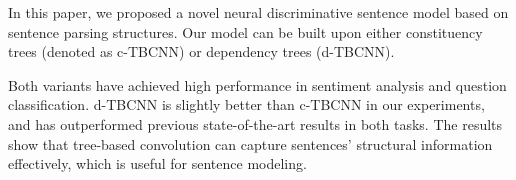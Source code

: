 \documentclass[11pt,a4paper]{article}
\begin{document}
\vspace{-.1cm}

In this paper, we proposed a novel neural
discriminative sentence model based on sentence parsing structures.
Our model can be built upon either constituency trees (denoted as c-TBCNN) or dependency trees (d-TBCNN).

Both variants have achieved high performance
in sentiment analysis and
question classification.
d-TBCNN is slightly better than c-TBCNN in our experiments, and 
has outperformed previous state-of-the-art results in both tasks. 
The results show that tree-based convolution
can capture sentences' structural information effectively, which
is useful for sentence modeling.





\end{document}

